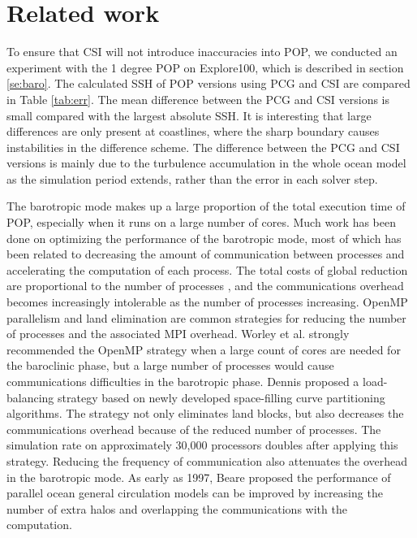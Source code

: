 \documentclass{sig-alternate}
\begin{document}
\section{Related work} \label{se:rel}
To ensure that CSI will not introduce inaccuracies into POP, we conducted an experiment with the 1 degree POP on Explore100, which is described in section \ref{se:baro}. The calculated SSH of POP versions using PCG and CSI are compared in Table \ref{tab:err}. The mean difference between the PCG and CSI versions is small compared with the largest absolute SSH. It is interesting that large differences are only present at coastlines, where the sharp boundary causes instabilities in the difference scheme. The difference between the PCG and CSI versions is mainly due to the turbulence accumulation in the whole ocean model as the simulation period extends, rather than the error in each solver step.

The barotropic mode makes up a large proportion of the total execution time of POP, especially when it runs on a large number of cores. Much work has been done on optimizing the performance of the barotropic mode, most of which has been related to decreasing the amount of communication between processes and accelerating the computation of each process. The total costs of global reduction are proportional to the number of processes , and the communications overhead becomes increasingly intolerable as the number of processes increasing. OpenMP parallelism and land elimination are common strategies for reducing the number of processes and the associated MPI overhead. Worley et al. \cite{Worley:2011:PCE:2063384.2063457} strongly recommended the OpenMP strategy when a large count of cores are needed for the baroclinic phase, but a large number of processes would cause communications difficulties in the barotropic phase.
Dennis \cite{dennis2007inverse,dennis2008scaling} proposed a load-balancing strategy based on newly developed space-filling curve partitioning algorithms. The strategy not only eliminates land blocks, but also decreases the communications overhead because of the reduced number of processes.  The simulation rate on approximately 30,000 processors doubles after applying this strategy. Reducing the frequency of communication also attenuates the overhead in the barotropic mode.
As early as 1997,  Beare \cite{beare1997optimisation} proposed the performance of parallel ocean general circulation models can be improved by increasing the number of extra halos and overlapping the communications with the computation.
\end{document}
